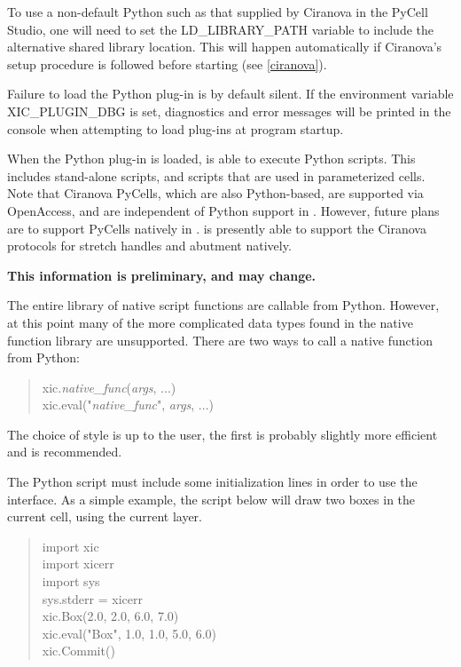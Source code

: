 To use a non-default Python such as that supplied by Ciranova in the
PyCell Studio, one will need to set the {\et LD\_LIBRARY\_PATH}
variable to include the alternative shared library location.
This will happen automatically if Ciranova's setup procedure is
followed before starting {\Xic} (see \ref{ciranova}).

Failure to load the Python plug-in is by default silent.  If the
environment variable {\vt XIC\_PLUGIN\_DBG} is set, diagnostics and
error messages will be printed in the console when attempting to load
plug-ins at program startup.

When the Python plug-in is loaded, {\Xic} is able to execute Python
scripts.  This includes stand-alone scripts, and scripts that are used
in parameterized cells.  Note that Ciranova PyCells, which are also
Python-based, are supported via OpenAccess, and are independent of
Python support in {\Xic}.  However, future plans are to support
PyCells natively in {\Xic}.  {\Xic} is presently able to support the
Ciranova protocols for stretch handles and abutment natively.

{\bf This information is preliminary, and may change.}

The entire library of native script functions are callable from
Python.  However, at this point many of the more complicated data
types found in the native function library are unsupported.  There are
two ways to call a native function from Python:

\begin{quote}
{\vt xic.}{\it native\_func\/}{\vt (}{\it args\/}, ...{\vt )}\\
{\vt xic.eval}{\vt ("}{\it native\_func\/}{\vt ",} {\it args\/}, {\vt ...)}
\end{quote}

The choice of style is up to the user, the first is probably slightly
more efficient and is recommended.

The Python script must include some initialization lines in order to
use the {\Xic} interface.  As a simple example, the script below will
draw two boxes in the current cell, using the current layer.

\begin{quote}\vt
import xic\\
import xicerr\\
import sys\\
sys.stderr = xicerr\\
xic.Box(2.0, 2.0, 6.0, 7.0)\\
xic.eval("Box", 1.0, 1.0, 5.0, 6.0)\\
xic.Commit()\\
\end{quote}

